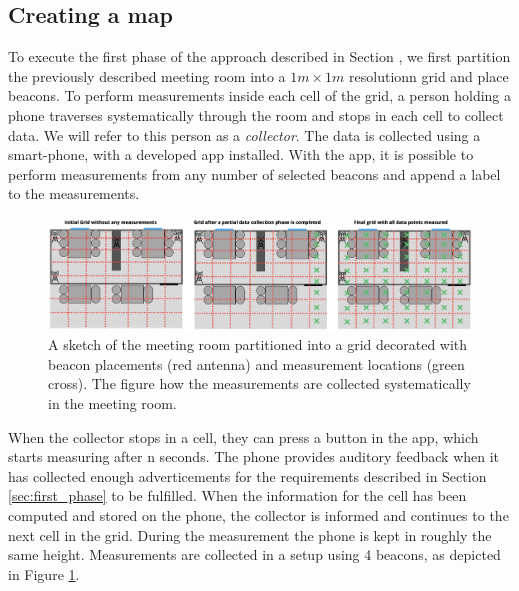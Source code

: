 \subsection{Creating a map}
To execute the first phase of the approach described in Section \label{sec:first_phase}, we first partition the previously described meeting room into a $1m \times 1m$ resolutionn grid and place beacons.
To perform measurements inside each cell of the grid, a person holding a phone traverses systematically through the room and stops in each cell to collect data. 
We will refer to this person as a \textit{collector}.
The data is collected using a smart-phone, with a developed app installed.   
With the app, it is possible to perform measurements from any number of selected beacons and append a label to the measurements.
\begin{figure}[h]
    \centering
    \includegraphics[width=\textwidth]{images/experiment_map_creation.png}
    \caption{A sketch of the meeting room partitioned into a grid decorated with beacon placements (red antenna) and measurement locations (green cross). The figure how the measurements are collected systematically in the meeting room.}
    \label{fig:experiment_map_creation}
\end{figure}

When the collector stops in a cell, they can press a button in the app, which starts measuring after n seconds. 
The phone provides auditory feedback when it has collected enough adverticements for the requirements described in Section \ref{sec:first_phase} to be fulfilled.
When the information for the cell has been computed and stored on the phone, the collector is informed and continues to the next cell in the grid. 
During the measurement the phone is kept in roughly the same height.
Measurements are collected in a setup using 4 beacons, as depicted in Figure \ref{fig:experiment_map_creation}.


